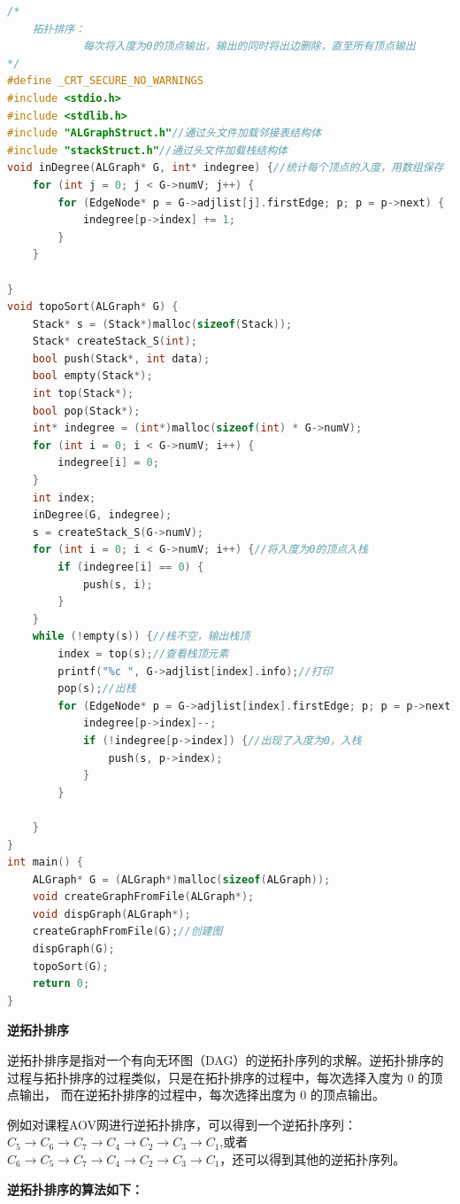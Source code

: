 \documentclass[lang=cn,newtx,10pt,scheme=chinese]{elegantbook}
\begin{document}
\begin{lstlisting}[language=C++, caption={拓扑排序算法}]
  /*
	拓扑排序：
			每次将入度为0的顶点输出，输出的同时将出边删除，直至所有顶点输出
*/
#define _CRT_SECURE_NO_WARNINGS
#include <stdio.h>
#include <stdlib.h>
#include "ALGraphStruct.h"//通过头文件加载邻接表结构体
#include "stackStruct.h"//通过头文件加载栈结构体
void inDegree(ALGraph* G, int* indegree) {//统计每个顶点的入度，用数组保存
	for (int j = 0; j < G->numV; j++) {
		for (EdgeNode* p = G->adjlist[j].firstEdge; p; p = p->next) {
			indegree[p->index] += 1;
		}
	}

}
void topoSort(ALGraph* G) {
	Stack* s = (Stack*)malloc(sizeof(Stack));
	Stack* createStack_S(int);
	bool push(Stack*, int data);
	bool empty(Stack*);
	int top(Stack*);
	bool pop(Stack*);
	int* indegree = (int*)malloc(sizeof(int) * G->numV);
	for (int i = 0; i < G->numV; i++) {
		indegree[i] = 0;
	}
	int index;
	inDegree(G, indegree);
	s = createStack_S(G->numV);
	for (int i = 0; i < G->numV; i++) {//将入度为0的顶点入栈
		if (indegree[i] == 0) {
			push(s, i);
		}
	}
	while (!empty(s)) {//栈不空，输出栈顶
		index = top(s);//查看栈顶元素
		printf("%c ", G->adjlist[index].info);//打印
		pop(s);//出栈
		for (EdgeNode* p = G->adjlist[index].firstEdge; p; p = p->next) {//将当前出栈的顶点所指向的顶点的入度均-1
			indegree[p->index]--;
			if (!indegree[p->index]) {//出现了入度为0，入栈
				push(s, p->index);
			}
		}

	}
}
int main() {
	ALGraph* G = (ALGraph*)malloc(sizeof(ALGraph));
	void createGraphFromFile(ALGraph*);
	void dispGraph(ALGraph*);
	createGraphFromFile(G);//创建图
	dispGraph(G);
	topoSort(G);
	return 0;
}
\end{lstlisting}

\textbf{逆拓扑排序}

逆拓扑排序是指对一个有向无环图（DAG）的逆拓扑序列的求解。逆拓扑排序的过程与拓扑排序的过程类似，只是在拓扑排序的过程中，每次选择入度为 $0$ 的顶点输出，
而在逆拓扑排序的过程中，每次选择出度为 $0$ 的顶点输出。

例如对课程AOV网进行逆拓扑排序，可以得到一个逆拓扑序列：$C_5 \to C_6 \to C_7 \to C_4 \to C_2 \to C_3 \to C_1$,或者
 $C_6 \to C_5 \to C_7 \to C_4 \to C_2 \to C_3 \to C_1$，还可以得到其他的逆拓扑序列。

\textbf{逆拓扑排序的算法如下：}
\end{document}
